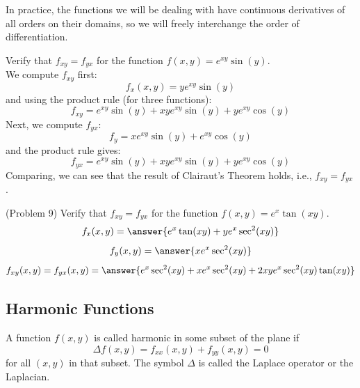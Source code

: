 \documentclass[handout]{ximera}
\begin{document}
\begin{remark}
In practice, the functions we will be dealing with have continuous 
derivatives of all orders on their domains, 
so we will freely interchange the order of differentiation.
\end{remark}

\begin{example}[Example 9]
Verify that $f_{xy} = f_{yx}$ for the function $f(x,y) = e^{xy}\sin(y)$.\\
We compute $f_{xy}$ first:
\[
f_x(x,y) = ye^{xy}\sin(y)
\]
and using the product rule (for three functions):
\[
f_{xy} = e^{xy}\sin(y) + xye^{xy}\sin(y) + ye^{xy}\cos(y)
\]
Next, we compute $f_{yx}$:
\[
f_y = xe^{xy}\sin(y) + e^{xy}\cos(y)
\]
and the product rule gives:
\[
f_{yx} = e^{xy}\sin(y) + xy e^{xy}\sin(y) +ye^{xy} \cos(y)
\]
Comparing, we can see that the result of Clairaut's Theorem holds, i.e., $f_{xy} = f_{yx}$.
\end{example}

\begin{problem}(Problem 9)
Verify that $f_{xy} = f_{yx}$ for the function $f(x,y) = e^x\tan(xy)$.\\
\[
f_x(x,y) = \answer{e^x \tan(xy) + ye^x \sec^2(xy)}
\]
\[
f_y(x,y) = \answer{xe^x\sec^2(xy)}
\]
\[
f_{xy}(x,y) = f_{yx}(x,y) = \answer{e^x\sec^2(xy) + xe^x\sec^2(xy) + 
2xye^x \sec^2(xy)\tan(xy)}
\]
\end{problem}

\subsection{Harmonic Functions}
\begin{definition}[Harmonic]
A function $f(x,y)$ is called harmonic in some subset of the plane if 
\[
\Delta f(x,y) = f_{xx}(x,y) + f_{yy}(x,y) = 0
\]
for all $(x,y)$ in that subset. The symbol $\Delta$ is called the Laplace operator or the Laplacian.
\end{definition}
\end{document}
